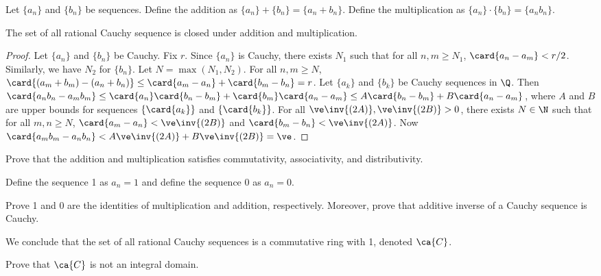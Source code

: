 \documentclass[10pt]{article}
\begin{document}
\par
Let $\{{a}_{n}\}$ and $\{{b}_{n}\}$ be sequences. Define the addition as $\{{a}_{n}\}+\{{b}_{n}\}=\{{a}_{n}+{b}_{n}\}$. Define the multiplication as $\{{a}_{n}\}\cdot\{{b}_{n}\}=\{{a}_{n}{b}_{n}\}$. 
\begin{proposition}
    The set of all rational Cauchy sequence is closed under addition and multiplication.
\end{proposition}
\begin{proof}
    Let $\{{a}_{n}\}$ and $\{{b}_{n}\}$ be Cauchy. Fix $r$. Since $\{{a}_{n}\}$ is Cauchy, there exists ${N}_{1}$ such that for all $n,m\ge{N}_{1}$, $\card{{a}_{n}-{a}_{m}}<r/2$. Similarly, we have ${N}_{2}$ for $\{{b}_{n}\}$. Let $N=\max({N}_{1},{N}_{2})$. For all $n,m\ge N$, $\card{({a}_{m}+{b}_{m})-({a}_{n}+{b}_{n})}\le\card{{a}_{m}-{a}_{n}}+\card{{b}_{m}-{b}_{n}}=r$. Let $\{{a}_{k}\}$ and $\{{b}_{k}\}$ be Cauchy sequences in $\Q$. Then $\card{{a}_{n}{b}_{n}-{a}_{m}{b}_{m}}\le\card{{a}_{n}}\card{{b}_{n}-{b}_{m}}+\card{{b}_{m}}\card{{a}_{n}-{a}_{m}}\le A\card{{b}_{n}-{b}_{m}}+B\card{{a}_{n}-{a}_{m}}$, where $A$ and $B$ are upper bounds for sequences $\{\card{{a}_{k}}\}$ and $\{\card{{b}_{k}}\}$. For all $\ve\inv{(2A)},\ve\inv{(2B)}>0$, there exists $N\in \N$ such that for all $m,n\ge N$, $\card{{a}_{m}-{a}_{n}}<\ve\inv{(2B)}$ and $\card{{b}_{m}-{b}_{n}}<\ve\inv{(2A)}$. Now $\card{{a}_{m}{b}_{m}-{a}_{n}{b}_{n}}<A\ve\inv{(2A)}+B\ve\inv{(2B)}= \ve$.
\end{proof}
\begin{problem}
    Prove that the addition and multiplication satisfies commutativity, associativity, and distributivity.
\end{problem}
\par
Define the sequence 1 as ${a}_{n}=1$ and define the sequence 0 as ${a}_{n}=0$.
\begin{problem}
    Prove 1 and 0 are the identities of multiplication and addition, respectively. Moreover, prove that additive inverse of a Cauchy sequence is Cauchy.
\end{problem}
\par
We conclude that the set of all rational Cauchy sequences is a commutative ring with 1, denoted $\ca{C}$.
\begin{problem}
    Prove that $\ca{C}$ is not an integral domain.
\end{problem}



\newpage
\end{document}
